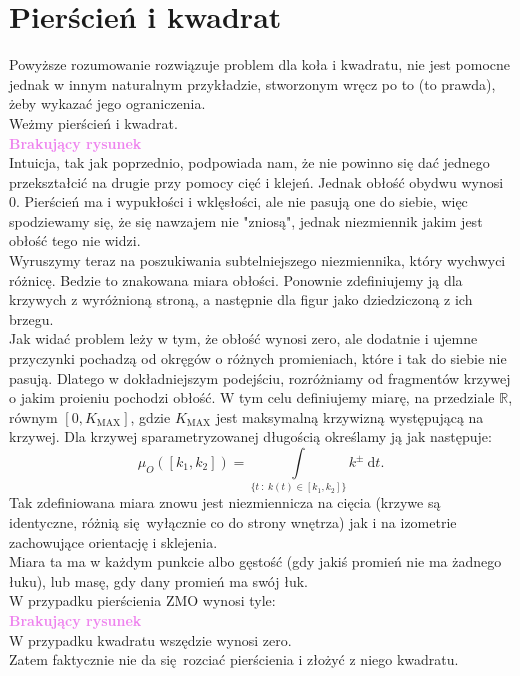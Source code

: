 \documentclass[a4paper, 12pt]{article}
\newcommand{\rysunek}[1]{\hfill \break\\[16pt] \Huge \textbf{\textcolor{violet}{Brakujący rysunek \normalsize
#1}} \hfill
\break \\[16pt] \normalsize}
\begin{document}
\section{Pierścień i kwadrat}\label{ZMO}
Powyższe rozumowanie rozwiązuje problem dla koła i kwadratu, nie jest pomocne jednak w innym naturalnym
przykładzie, stworzonym wręcz po to (to prawda), żeby wykazać jego ograniczenia. \\
Weżmy pierścień i kwadrat.
\rysunek{}
Intuicja, tak jak poprzednio, podpowiada nam, że nie powinno się dać jednego przekształcić na drugie
przy pomocy cięć i klejeń. Jednak obłość obydwu wynosi $0$.
Pierścień ma i wypukłości i wklęsłości, ale nie pasują one do siebie, więc spodziewamy się, że się nawzajem
nie "zniosą", jednak niezmiennik jakim jest obłość tego nie widzi. \\
Wyruszymy teraz na poszukiwania subtelniejszego niezmiennika, który wychwyci różnicę. Bedzie to
znakowana miara obłości. Ponownie zdefiniujemy ją dla krzywych z wyróżnioną stroną, a następnie
dla figur jako dziedziczoną z ich brzegu. \\
Jak widać problem leży w tym, że obłość wynosi zero, ale dodatnie i ujemne przyczynki pochadzą od okręgów
o różnych promieniach, które i tak do siebie nie pasują. Dlatego w dokładniejszym podejściu, rozróżniamy
od fragmentów krzywej o jakim proieniu pochodzi obłość. W tym celu definiujemy miarę, na przedziale
$\mathbb{R}$, równym $[0, K_\text{MAX}]$, gdzie $K_\text{MAX}$ jest maksymalną krzywizną występującą na
krzywej. Dla krzywej sparametryzowanej długością określamy ją jak następuje:
\begin{equation}
    \mu_O([k_1, k_2]) = \displaystyle\int\limits_{\{t\ :\ k(t) \in [k_1, k_2]\}}
    k^\pm\ \textrm{d}t.
\end{equation}
Tak zdefiniowana miara znowu jest niezmiennicza na cięcia (krzywe są identyczne, różnią się wyłącznie co do
strony wnętrza) jak i na izometrie zachowujące orientację i sklejenia. \\
Miara ta ma w każdym punkcie albo gęstość (gdy jakiś promień nie ma żadnego łuku), lub masę, gdy dany promień
 ma swój łuk. \\
 W przypadku pierścienia ZMO wynosi tyle:
 \rysunek{}
 W przypadku kwadratu wszędzie wynosi zero. \\
 Zatem faktycznie nie da się rozciać pierścienia i złożyć z niego kwadratu. \\
\end{document}
